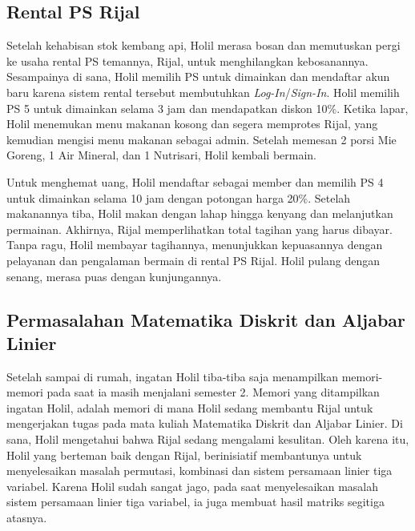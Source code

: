 \documentclass[../main.tex]{subfiles}
\begin{document}
    \subsection{Rental PS Rijal}
    Setelah kehabisan stok kembang api, Holil merasa bosan dan memutuskan pergi ke usaha rental PS temannya, Rijal, untuk menghilangkan kebosanannya. Sesampainya di sana, Holil memilih PS untuk dimainkan dan mendaftar akun baru karena sistem rental tersebut membutuhkan \textit{Log-In}/\textit{Sign-In}. Holil memilih PS 5 untuk dimainkan selama 3 jam dan mendapatkan diskon 10\%. Ketika lapar, Holil menemukan menu makanan kosong dan segera memprotes Rijal, yang kemudian mengisi menu makanan sebagai admin. Setelah memesan 2 porsi Mie Goreng, 1 Air Mineral, dan 1 Nutrisari, Holil kembali bermain.

    Untuk menghemat uang, Holil mendaftar sebagai member dan memilih PS 4 untuk dimainkan selama 10 jam dengan potongan harga 20\%. Setelah makanannya tiba, Holil makan dengan lahap hingga kenyang dan melanjutkan permainan. Akhirnya, Rijal memperlihatkan total tagihan yang harus dibayar. Tanpa ragu, Holil membayar tagihannya, menunjukkan kepuasannya dengan pelayanan dan pengalaman bermain di rental PS Rijal. Holil pulang dengan senang, merasa puas dengan kunjungannya.


    \subsection{Permasalahan Matematika Diskrit dan Aljabar Linier}

    Setelah sampai di rumah, ingatan Holil tiba-tiba saja menampilkan memori-memori pada saat ia masih menjalani semester 2. Memori yang ditampilkan ingatan Holil, adalah memori di mana Holil sedang membantu Rijal untuk mengerjakan tugas pada mata kuliah Matematika Diskrit dan Aljabar Linier. Di sana, Holil mengetahui bahwa Rijal sedang mengalami kesulitan. Oleh karena itu, Holil yang berteman baik dengan Rijal, berinisiatif membantunya untuk menyelesaikan masalah permutasi, kombinasi dan sistem persamaan linier tiga variabel. Karena Holil sudah sangat jago, pada saat menyelesaikan masalah sistem persamaan linier tiga variabel, ia juga membuat hasil matriks segitiga atasnya.

\end{document}
